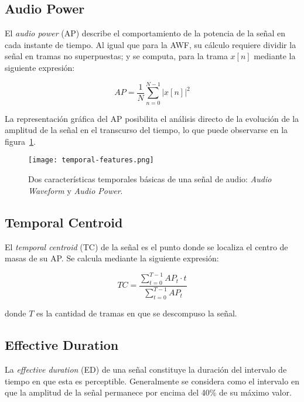 \subsection{Audio Power}\label{subsec:audioPower}

El \textit{audio power} (AP) describe el comportamiento de la potencia de la señal en cada instante de tiempo.
Al igual que para la AWF, su cálculo requiere dividir la señal en tramas no superpuestas;
y se computa, para la trama $x[n]$ mediante la siguiente expresión:

\begin{equation}
    \label{eq:AP}
    AP = \frac{1}{N}\sum_{n=0}^{N-1}{|x[n]|^2}
\end{equation}

La representación gráfica del AP posibilita el análisis directo de la evolución de la amplitud de la señal en el transcurso del tiempo, lo que puede observarse en la figura~\ref{img:awf+ap}.

\begin{figure}[!h]
    \centering
    \texttt{[image: temporal-features.png]}
    \caption{Dos características temporales básicas de una señal de audio: \textit{Audio Waveform} y \textit{Audio Power}.}
    \label{img:awf+ap}
\end{figure}

\subsection{Temporal Centroid}\label{subsec:temporalCentroid}

El \textit{temporal centroid} (TC) de la señal es el punto donde se localiza el centro de masas de su AP\@.
Se calcula mediante la siguiente expresión:

\begin{equation}
    \label{eq:TC}
    TC = \frac{\sum_{t=0}^{T-1}{AP_t \cdot t}}{\sum_{t=0}^{T-1}{AP_t}}
\end{equation}

\noindent
donde $T$ es la cantidad de tramas en que se descompuso la señal.

\subsection{Effective Duration}\label{subsec:effectiveDuration}

La \textit{effective duration} (ED) de una señal constituye la duración del intervalo de tiempo en que esta es perceptible.
Generalmente se considera como el intervalo en que la amplitud de la señal permanece por encima del 40\% de su máximo valor.

